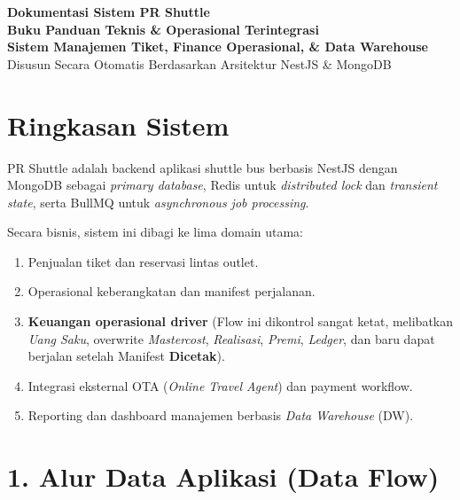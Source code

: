 \documentclass[11pt,a4paper]{article}
\begin{document}
\begin{titlepage}
    \centering
    \vspace*{2cm}
    {\Huge \textbf{\textcolor{primary}{Dokumentasi Sistem PR Shuttle}}}\\[1.5cm]
    {\LARGE \textbf{Buku Panduan Teknis \& Operasional Terintegrasi}}\\[1cm]
    \vfill
    {\Large \textbf{Sistem Manajemen Tiket, Finance Operasional, \& Data Warehouse}}\\[0.5cm]
    {\large Disusun Secara Otomatis Berdasarkan Arsitektur NestJS \& MongoDB}\\[2cm]
\end{titlepage}

\clearpage
\tableofcontents
\clearpage

\section{Ringkasan Sistem}
PR Shuttle adalah backend aplikasi shuttle bus berbasis NestJS dengan MongoDB sebagai \textit{primary database}, Redis untuk \textit{distributed lock} dan \textit{transient state}, serta BullMQ untuk \textit{asynchronous job processing}. 

Secara bisnis, sistem ini dibagi ke lima domain utama:
\begin{enumerate}
    \item Penjualan tiket dan reservasi lintas outlet.
    \item Operasional keberangkatan dan manifest perjalanan.
    \item \textbf{Keuangan operasional driver} (Flow ini dikontrol sangat ketat, melibatkan \textit{Uang Saku}, overwrite \textit{Mastercost}, \textit{Realisasi}, \textit{Premi}, \textit{Ledger}, dan baru dapat berjalan setelah Manifest \textbf{Dicetak}).
    \item Integrasi eksternal OTA (\textit{Online Travel Agent}) dan payment workflow.
    \item Reporting dan dashboard manajemen berbasis \textit{Data Warehouse} (DW).
\end{enumerate}

\section{1. Alur Data Aplikasi (Data Flow)}
\end{document}
